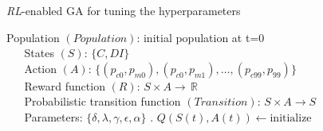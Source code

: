 \documentclass[acmsmall]{acmart}
\newcommand{\RL}{$RL$}
\begin{document}
\begin{algorithm}[h]
    \caption{\textit{RL}-enabled GA for tuning the hyperparameters}
    \label{alg:\RL-GA}
    
    \begin{algorithmic}[h]
    \Require Population $(Population)$: initial population at t=0  \\ $\quad \;$ 
    States $(S)$: $\{C, DI\}$    \\ $\quad \;$
    Action $(A)$: $\{(p_{c0}, p_{m0}), (p_{c0}, p_{m1}), \dots, (p_{c99}, p_{99})\}$ \\ $\quad \;$
    Reward function $(R)$: $S \times A \rightarrow \, \mathbb{R}$ \\ $\quad \;$ 
    Probabilistic transition function $(Transition)$: $ S \times A \rightarrow S $  \\ $\quad \;$ 
     Parameters: $\{\delta, \lambda, \gamma, \epsilon, \alpha \} $               
        \Function{GA\RL} {$.$} 
             \State $Q (S(t), A(t)) \leftarrow \text{initialize} $
                
                 
               
                
                
                 

\end{algorithmic}
\end{algorithm}
\end{document}
